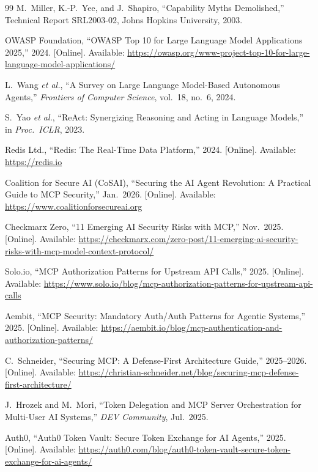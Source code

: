 \documentclass[journal]{IEEEtran}
\theoremstyle{definition}
\begin{document}
\begin{thebibliography}{99}
M.\ Miller, K.-P.\ Yee, and J.\ Shapiro,
``Capability Myths Demolished,''
Technical Report SRL2003-02, Johns Hopkins University, 2003.

OWASP Foundation,
``OWASP Top 10 for Large Language Model Applications 2025,'' 2024.
[Online]. Available:
\url{https://owasp.org/www-project-top-10-for-large-language-model-applications/}

L.\ Wang \textit{et al.},
``A Survey on Large Language Model-Based Autonomous Agents,''
\textit{Frontiers of Computer Science}, vol.\ 18, no.\ 6, 2024.

S.\ Yao \textit{et al.},
``ReAct: Synergizing Reasoning and Acting in Language Models,''
in \textit{Proc.\ ICLR}, 2023.

Redis Ltd., ``Redis: The Real-Time Data Platform,'' 2024.
[Online]. Available: \url{https://redis.io}

Coalition for Secure AI (CoSAI),
``Securing the AI Agent Revolution: A Practical Guide to MCP Security,''
Jan.\ 2026.
[Online]. Available: \url{https://www.coalitionforsecureai.org}

Checkmarx Zero,
``11 Emerging AI Security Risks with MCP,'' Nov.\ 2025.
[Online]. Available:
\url{https://checkmarx.com/zero-post/11-emerging-ai-security-risks-with-mcp-model-context-protocol/}

Solo.io,
``MCP Authorization Patterns for Upstream API Calls,'' 2025.
[Online]. Available:
\url{https://www.solo.io/blog/mcp-authorization-patterns-for-upstream-api-calls}

Aembit,
``MCP Security: Mandatory Auth/Auth Patterns for Agentic Systems,'' 2025.
[Online]. Available:
\url{https://aembit.io/blog/mcp-authentication-and-authorization-patterns/}

C.\ Schneider,
``Securing MCP: A Defense-First Architecture Guide,'' 2025--2026.
[Online]. Available:
\url{https://christian-schneider.net/blog/securing-mcp-defense-first-architecture/}

J.\ Hrozek and M.\ Mori,
``Token Delegation and MCP Server Orchestration for Multi-User AI Systems,''
\textit{DEV Community}, Jul.\ 2025.

Auth0,
``Auth0 Token Vault: Secure Token Exchange for AI Agents,'' 2025.
[Online]. Available:
\url{https://auth0.com/blog/auth0-token-vault-secure-token-exchange-for-ai-agents/}


\end{thebibliography}
\end{document}
